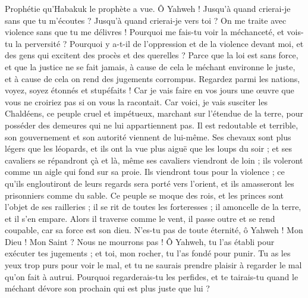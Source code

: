 \begin{multicols}{2}
\VerseOne{}Prophétie qu'Habakuk le prophète a vue.
Ô Yahweh ! Jusqu'à quand crierai-je sans que tu m'écoutes ? Jusqu'à quand crierai-je vers toi ? On me traite avec violence sans que tu me délivres !
Pourquoi me fais-tu voir la méchanceté, et vois-tu la perversité ? Pourquoi y a-t-il de l'oppression et de la violence devant moi, et des gens qui excitent des procès et des querelles ?
Parce que la loi est sans force, et que la justice ne se fait jamais, à cause de cela le méchant environne le juste, et à cause de cela on rend des jugements corrompus.
Regardez parmi les nations, voyez, soyez étonnés et stupéfaits ! Car je vais faire en vos jours une œuvre que vous ne croiriez pas si on vous la racontait.
Car voici, je vais susciter les Chaldéens, ce peuple cruel et impétueux, marchant sur l'étendue de la terre, pour posséder des demeures qui ne lui appartiennent pas.
Il est redoutable et terrible, son gouvernement et son autorité viennent de lui-même.
Ses chevaux sont plus légers que les léopards, et ils ont la vue plus aiguë que les loups du soir ; et ses cavaliers se répandront çà et là, même ses cavaliers viendront de loin ; ils voleront comme un aigle qui fond sur sa proie.
Ils viendront tous pour la violence ; ce qu'ils engloutiront de leurs regards sera porté vers l'orient, et ils amasseront les prisonniers comme du sable.
Ce peuple se moque des rois, et les princes sont l'objet de ses railleries ; il se rit de toutes les forteresses ; il amoncelle de la terre, et il s'en empare.
Alors il traverse comme le vent, il passe outre et se rend coupable, car sa force est son dieu.
N'es-tu pas de toute éternité, ô Yahweh ! Mon Dieu ! Mon Saint ? Nous ne mourrons pas ! Ô Yahweh, tu l'as établi pour exécuter tes jugements ; et toi, mon rocher, tu l'as fondé pour punir.
Tu as les yeux trop purs pour voir le mal, et tu ne saurais prendre plaisir à regarder le mal qu'on fait à autrui. Pourquoi regarderais-tu les perfides, et te tairais-tu quand le méchant dévore son prochain qui est plus juste que lui ?

\end{multicols}
